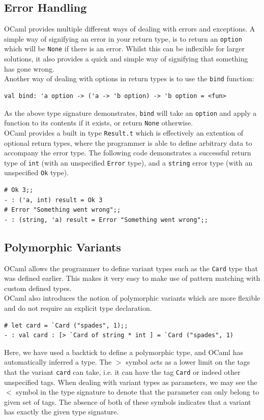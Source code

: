 \documentclass[12pt,a4paper,twoside,openright]{report}
\begin{document}
		\subsection*{Error Handling}
		OCaml provides multiple different ways of dealing with errors and exceptions. 
		A simple way of signifying an error in your return type, is to return an \texttt{option} which will be \texttt{None} if there is an error. 
		Whilst this can be inflexible for larger solutions, it also provides a quick and simple way of signifying that something has gone wrong.\\

		Another way of dealing with options in return types is to use the \texttt{bind} function:
		\begin{lstlisting}
val bind: 'a option -> ('a -> 'b option) -> 'b option = <fun>
		\end{lstlisting} 
		As the above type signature demonstrates, \texttt{bind} will take an \texttt{option} and apply a function to its contents if it exists, or return \texttt{None} otherwise.\\
		
		OCaml provides a built in type \texttt{Result.t} which is effectively an extention of optional return types, where the programmer is able to define arbitrary data to accompany the error type. The following code demonstrates a successful return type of \texttt{int} (with an unspecified \texttt{Error} type), and a \texttt{string} error type (with an unspecified \texttt{Ok} type).
		\begin{lstlisting}
# Ok 3;;
- : ('a, int) result = Ok 3
# Error "Something went wrong";;
- : (string, 'a) result = Error "Something went wrong";;
		\end{lstlisting} 

		\subsection*{Polymorphic Variants}
		OCaml allows the programmer to define variant types such as the \texttt{Card} type that was defined earlier. This makes it very easy to make use of pattern matching with custom defined types.\\
		
		OCaml also introduces the notion of polymorphic variants which are more flexible and do not require an explicit type declaration.
		\begin{lstlisting}
# let card = `Card ("spades", 1);;
- : val card : [> `Card of string * int ] = `Card ("spades", 1)
		\end{lstlisting}
		Here, we have used a backtick to define a polymorphic type, and OCaml has automatically inferred a type. 
		The $>$ symbol acts as a lower limit on the tags that the variant \texttt{card} can take, i.e. it can have the tag \texttt{Card} or indeed other unspecified tags.
		When dealing with variant types as parameters, we may see the $<$ symbol in the type signature to denote that the parameter can only belong to given set of tags. The absence of both of these symbols indicates that a variant has exactly the given type signature. 
\end{document}

